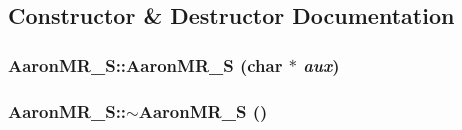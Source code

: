 \subsection{Constructor \& Destructor Documentation}
\hypertarget{classAaronMR__S_a1c4c6e2d89d0d072b5b9f9130da074dd}{
\subsubsection[{AaronMR\_\-S}]{\setlength{\rightskip}{0pt plus 5cm}AaronMR\_\-S::AaronMR\_\-S (char $\ast$ {\em aux})}}
\label{classAaronMR__S_a1c4c6e2d89d0d072b5b9f9130da074dd}
\hypertarget{classAaronMR__S_a56d7f2d8650052b514c5d74234f62526}{
\subsubsection[{$\sim$AaronMR\_\-S}]{\setlength{\rightskip}{0pt plus 5cm}AaronMR\_\-S::$\sim$AaronMR\_\-S ()}}
\label{classAaronMR__S_a56d7f2d8650052b514c5d74234f62526}


